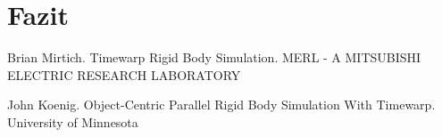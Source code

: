 \documentclass[a4paper, 10pt, openright, parskip, chapterprefix]{scrreprt}
\begin{document}
\chapter{Fazit}
\begin{thebibliography}{10}
Brian Mirtich. Timewarp Rigid Body Simulation. MERL - A MITSUBISHI ELECTRIC RESEARCH LABORATORY

John Koenig. Object-Centric Parallel Rigid Body Simulation With Timewarp. University of Minnesota
\end{thebibliography}
\end{document}
